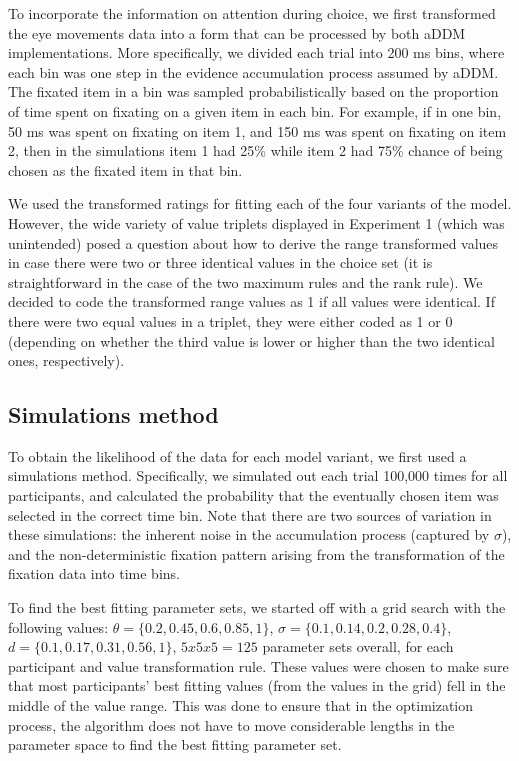 \documentclass[11pt,a4paper]{article}
\begin{document}
To incorporate the information on attention during choice, we first transformed the eye movements data into a form that can be processed by both aDDM implementations. More specifically, we divided each trial into 200 ms bins, where each bin was one step in the evidence accumulation process assumed by aDDM. The fixated item in a bin was sampled probabilistically based on the proportion of time spent on fixating on a given item in each bin. For example, if in one bin, 50 ms was spent on fixating on item 1, and 150 ms was spent on fixating on item 2, then in the simulations item 1 had 25\% while item 2 had 75\% chance of being chosen as the fixated item in that bin. 

We used the transformed ratings for fitting each of the four variants of the model. However, the wide variety of value triplets displayed in Experiment 1 (which was unintended) posed a question about how to derive the range transformed values in case there were two or three identical values in the choice set (it is straightforward in the case of the two maximum rules and the rank rule). We decided to code the transformed range values as 1 if all values were identical. If there were two equal values in a triplet, they were either coded as 1 or 0 (depending on whether the third value is lower or higher than the two identical ones, respectively). 

\subsection{Simulations method}

To obtain the likelihood of the data for each model variant, we first used a simulations method. Specifically, we simulated out each trial 100,000 times for all participants, and calculated the probability that the eventually chosen item was selected in the correct time bin. Note that there are two sources of variation in these simulations: the inherent noise in the accumulation process (captured by $\sigma$), and the non-deterministic fixation pattern arising from the transformation of the fixation data into time bins.

To find the best fitting parameter sets, we started off with a grid search with the following values: $\theta=\{0.2, 0.45, 0.6, 0.85, 1\}$, $\sigma=\{0.1, 0.14, 0.2, 0.28, 0.4\}$, $\textit{d}=\{0.1, 0.17, 0.31, 0.56, 1\}$, $5x5x5 = 125$ parameter sets overall, for each participant and value transformation rule. These values were chosen to make sure that most participants' best fitting values (from the values in the grid) fell in the middle of the value range. This was done to ensure that in the optimization process, the algorithm does not have to move considerable lengths in the parameter space to find the best fitting parameter set.
\end{document}
